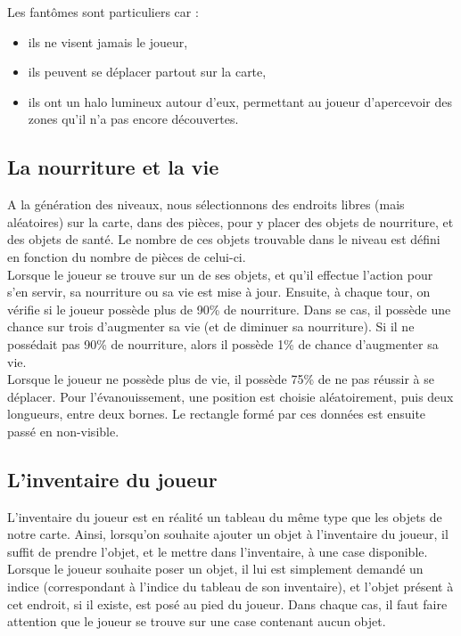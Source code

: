 \documentclass[11pt]{report}
\begin{document}
		Les fantômes sont particuliers car :
		\begin{itemize}
			\item ils ne visent jamais le joueur,
			\item ils peuvent se déplacer partout sur la carte,
			\item ils ont un halo lumineux autour d'eux, permettant au joueur d'apercevoir des zones qu'il n'a pas encore découvertes.
		\end{itemize}
		
		\subsection{La nourriture et la vie}
		
		A la génération des niveaux, nous sélectionnons des endroits libres (mais aléatoires) sur la carte, dans des pièces, pour y placer des objets de nourriture, et des objets de santé. Le nombre de ces objets trouvable dans le niveau est défini en fonction du nombre de pièces de celui-ci. \\ Lorsque le joueur se trouve sur un de ses objets, et qu'il effectue l'action pour s'en servir, sa nourriture ou sa vie est mise à jour. Ensuite, à chaque tour, on vérifie si le joueur possède plus de 90\% de nourriture. Dans se cas, il possède une chance sur trois d'augmenter sa vie (et de diminuer sa nourriture). Si il ne possédait pas 90\% de nourriture, alors il possède 1\% de chance d'augmenter sa vie.\\
		Lorsque le joueur ne possède plus de vie, il possède 75\% de ne pas réussir à se déplacer. Pour l'évanouissement, une position est choisie aléatoirement, puis deux longueurs, entre deux bornes. Le rectangle formé par ces données est ensuite passé en non-visible.
		
		\subsection{L'inventaire du joueur}

		L'inventaire du joueur est en réalité un tableau du même type que les objets de notre carte. Ainsi, lorsqu'on souhaite ajouter un objet à l'inventaire du joueur, il suffit de prendre l'objet, et le mettre dans l'inventaire, à une case disponible. Lorsque le joueur souhaite poser un objet, il lui est simplement demandé un indice (correspondant à l'indice du tableau de son inventaire), et l'objet présent à cet endroit, si il existe, est posé au pied du joueur. Dans chaque cas, il faut faire attention que le joueur se trouve sur une case contenant aucun objet.
\end{document}

